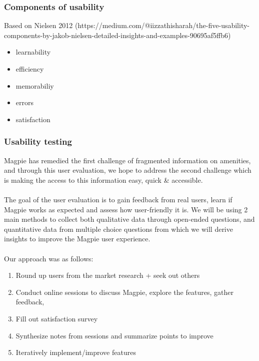 \subsubsection{Components of usability}
Based on Nielsen 2012 (https://medium.com/@iizzathisharah/the-five-usability-components-by-jakob-nielsen-detailed-insights-and-examples-90695af5ffb6)

\begin{itemize}
    \item learnability
    \item efficiency
    \item memorabiliy
    \item errors
    \item satisfaction
\end{itemize}

\newpage
\subsubsection{Usability testing}
Magpie has remedied the first challenge of fragmented information on
amenities, and through this user evaluation, we hope to address the second challenge
which is making the access to this information easy, quick \& accessible.\\\\

The goal of the user evaluation is to gain feedback from real users, learn if
Magpie works as expected and assess how user-friendly it is. We will be using 2
main methods to collect both qualitative data through open-ended questions, and
quantitative data from multiple choice questions from which we will derive
insights to improve the Magpie user experience.\\\\

Our approach was as follows:
\begin{enumerate}
    \item Round up users from the market research + seek out others
    \item Conduct online sessions to discuss Magpie, explore the features, gather feedback,
    \item Fill out satisfaction survey
    \item Synthesize notes from sessions and summarize points to improve
    \item Iteratively implement/improve features
\end{enumerate}

